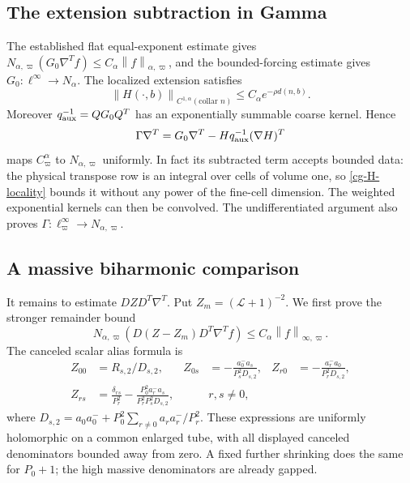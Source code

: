\documentclass[11pt]{article}
\theoremstyle{remark}
\newcommand{\norm}[1]{\left\|#1\right\|}
\begin{document}
\subsection{The extension subtraction in Gamma}

The established flat equal-exponent estimate gives
$N_{\alpha,\varpi}(G_0\nabla^Tf)
\le C_\alpha\norm{f}_{\alpha,\varpi}$, and the bounded-forcing
estimate gives $G_0:\ell^\infty\to N_\alpha$.
The localized extension satisfies
\begin{equation}\label{cg-H-locality}
 \norm{H(\cdot,b)}_{C^{1,\alpha}(\text{collar }n)}
       \le C_\alpha e^{-\rho d(n,b)}.
\end{equation}
Moreover $q_{\rm aux}^{-1}=QG_0Q^T$ has an exponentially
summable coarse kernel. Hence
\begin{equation}\label{cg-Gamma-derivative}
 \Gamma\nabla^T=G_0\nabla^T
          -Hq_{\rm aux}^{-1}(\nabla H)^T
\end{equation}
maps $C^\alpha_\varpi$ to $N_{\alpha,\varpi}$ uniformly.
In fact its subtracted term accepts bounded data: the physical
transpose row is an integral over cells of volume one, so
\eqref{cg-H-locality} bounds it without any power of the fine-cell
dimension. The weighted exponential kernels can then be convolved.
The undifferentiated argument also proves
$\Gamma:\ell^\infty_\varpi\to N_{\alpha,\varpi}$.

\subsection{A massive biharmonic comparison}
\label{cg-biharmonic}

It remains to estimate $DZD^T\nabla^T$. Put
$Z_m=(\mathcal L+1)^{-2}$. We first prove the stronger remainder
bound
\begin{equation}\label{cg-remainder}
 N_{\alpha,\varpi}
   (D(Z-Z_m)D^T\nabla^Tf)
       \le C_\alpha\norm{f}_{\infty,\varpi}.
\end{equation}
The canceled scalar alias formula is
\begin{align}
 Z_{00}&=R_{s,2}/D_{s,2},&
 Z_{0s}&=-\frac{a_0^-a_s}{P_s^2D_{s,2}},&
 Z_{r0}&=-\frac{a_r^-a_0}{P_r^2D_{s,2}},\nonumber\\
 Z_{rs}&=\frac{\delta_{rs}}{P_r^2}
       -\frac{P_0^2a_r^-a_s}{P_r^2P_s^2D_{s,2}},
 &&r,s\ne0,                                   \label{cg-Z-alias}
\end{align}
where $D_{s,2}=a_0a_0^-+P_0^2\sum_{r\ne0}a_ra_r^-/P_r^2$.
These expressions are uniformly holomorphic on a common enlarged
tube, with all displayed canceled denominators bounded away from
zero. A fixed further shrinking does the same for $P_0+1$;
the high massive denominators are already gapped.
\end{document}

